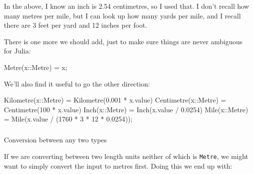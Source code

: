 \documentclass[
]{article}
\makeatletter
\let\oldsubparagraph\subparagraph
\renewcommand{\subparagraph}{
    \@ifstar
      \xxxSubParagraphStar
      \xxxSubParagraphNoStar
  }
\newcommand{\xxxSubParagraphStar}[1]{\oldsubparagraph*{#1}\mbox{}}
\newcommand{\xxxSubParagraphNoStar}[1]{\oldsubparagraph{#1}\mbox{}}
\newenvironment{Shaded}{\begin{snugshade}}{\end{snugshade}}
\newcommand{\DataTypeTok}[1]{\textcolor[rgb]{0.68,0.00,0.00}{#1}}
\newcommand{\FloatTok}[1]{\textcolor[rgb]{0.68,0.00,0.00}{#1}}
\newcommand{\FunctionTok}[1]{\textcolor[rgb]{0.28,0.35,0.67}{#1}}
\newcommand{\NormalTok}[1]{\textcolor[rgb]{0.00,0.23,0.31}{#1}}
\newcommand{\OperatorTok}[1]{\textcolor[rgb]{0.37,0.37,0.37}{#1}}
\makeatother
\begin{document}
In the above, I know an inch is 2.54 centimetres, so I used that. I
don't recall how many metres per mile, but I can look up how many yards
per mile, and I recall there are 3 feet per yard and 12 inches per foot.

There is one more we should add, just to make sure things are never
ambiguous for Julia:

\begin{Shaded}
\begin{Highlighting}[]
\FunctionTok{Metre}\NormalTok{(x}\OperatorTok{::}\DataTypeTok{Metre}\NormalTok{) }\OperatorTok{=}\NormalTok{ x;}
\end{Highlighting}
\end{Shaded}

We'll also find it useful to go the other direction:

\begin{Shaded}
\begin{Highlighting}[]
\FunctionTok{Kilometre}\NormalTok{(x}\OperatorTok{::}\DataTypeTok{Metre}\NormalTok{) }\OperatorTok{=} \FunctionTok{Kilometre}\NormalTok{(}\FloatTok{0.001} \OperatorTok{*}\NormalTok{ x.value)}
\FunctionTok{Centimetre}\NormalTok{(x}\OperatorTok{::}\DataTypeTok{Metre}\NormalTok{) }\OperatorTok{=} \FunctionTok{Centimetre}\NormalTok{(}\FloatTok{100} \OperatorTok{*}\NormalTok{ x.value)}
\FunctionTok{Inch}\NormalTok{(x}\OperatorTok{::}\DataTypeTok{Metre}\NormalTok{) }\OperatorTok{=} \FunctionTok{Inch}\NormalTok{(x.value }\OperatorTok{/} \FloatTok{0.0254}\NormalTok{)}
\FunctionTok{Mile}\NormalTok{(x}\OperatorTok{::}\DataTypeTok{Metre}\NormalTok{) }\OperatorTok{=} \FunctionTok{Mile}\NormalTok{(x.value }\OperatorTok{/}\NormalTok{ (}\FloatTok{1760} \OperatorTok{*} \FloatTok{3} \OperatorTok{*} \FloatTok{12} \OperatorTok{*} \FloatTok{0.0254}\NormalTok{));}
\end{Highlighting}
\end{Shaded}

\subparagraph{Conversion between any two
types}\label{conversion-between-any-two-types}

If we are converting between two length units neither of which is
\texttt{Metre}, we might want to simply convert the input to metres
first. Doing this we end up with:
\end{document}
